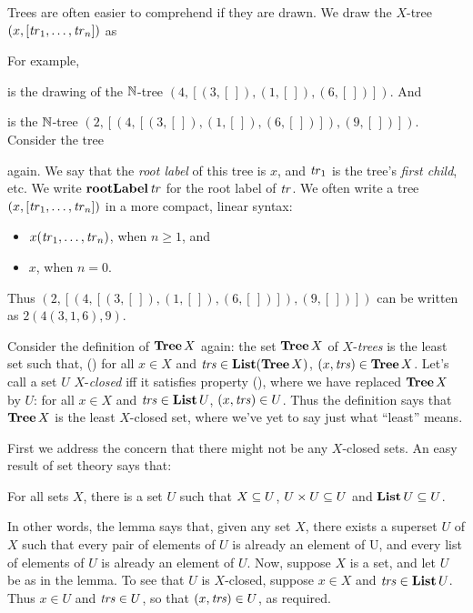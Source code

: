 Trees are often easier to comprehend if they are drawn.
We draw the $X$-tree $(x,[{\it tr}_1,\ldots,{\it tr}_n])$ as
\begin{center}

\end{center}
For example,
\begin{center}

\end{center}
is the drawing of the $\mathbb{N}$-tree $(4,[(3,[\,]), (1,[\,]), (6,[\,])])$.
And
\begin{center}

\end{center}
is the $\mathbb{N}$-tree $(2,[(4,[(3,[\,]), (1,[\,]), (6,[\,])]),(9,[\,])])$.
Consider the tree
\begin{center}

\end{center}
again.
We say that the \emph{root label} of this tree is $x$, and ${\it tr}_1$ is the tree's
\emph{first child}, etc.
We write $\mathbf{rootLabel}\,{\it tr}$ for the root label of ${\it tr}$.
We often write a tree $(x,[{\it tr}_1,\ldots,{\it tr}_n])$ in a more
compact, linear syntax:
\begin{itemize}
\item $x({\it tr}_1,\ldots,{\it tr}_n)$, when $n\geq 1$, and

\item $x$, when $n=0$.
\end{itemize}
Thus $(2,[(4,[(3,[\,]), (1,[\,]), (6,[\,])]),(9,[\,])])$
can be written as $2(4(3,1,6),9)$.

Consider the definition of $\mathbf{Tree}\,X$ again: the set $\mathbf{Tree}\,X$ of
$X$-\emph{trees} is the least set such that, (\dag) for all $x\in X$ and
${\it trs}\in\mathbf{List}(\mathbf{Tree}\,X)$, $(x,{\it trs})\in\mathbf{Tree}\,X$.
Let's call a set $U$ $X$-\emph{closed} iff it satisfies property (\dag),
where we have replaced $\mathbf{Tree}\,X$ by $U$:
for all $x\in X$ and ${\it trs}\in\mathbf{List}\,U$, $(x,{\it trs})\in U$.
Thus the definition says that $\mathbf{Tree}\,X$ is the least $X$-closed set,
where we've yet to say just what ``least'' means.

First we address the concern that there might not be any $X$-closed sets.
An easy result of set theory says that:

\begin{lemma}
\label{ClosureLem}
For all sets $X$, there is a set $U$ such that
$X\subseteq U$, $U\times U\subseteq U$ and $\mathbf{List}\,U\subseteq U$.
\end{lemma}

In other words, the lemma says that, given any set $X$, there
exists a superset $U$ of $X$ such that every pair of elements of $U$
is already an element of U, and every list of elements of $U$ is
already an element of $U$.  Now, suppose $X$ is a set, and let $U$ be
as in the lemma.  To see that $U$ is $X$-closed, suppose $x\in
X$ and ${\it trs}\in\mathbf{List}\,U$.  Thus $x\in U$ and ${\it trs}\in U$, so that
$(x,{\it trs})\in U$, as required.

